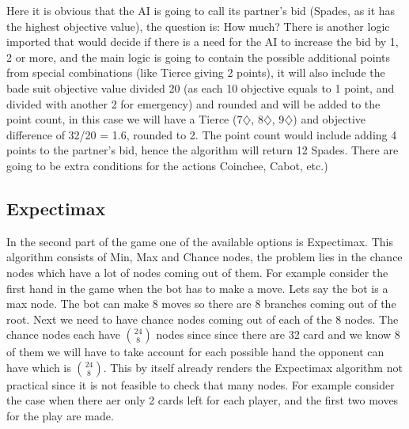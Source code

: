 Here it is obvious that the AI
is going to call its partner's bid (Spades, as it has the highest objective value), the question is: How much? There is another logic
imported that would decide if there is a need for the AI to increase the bid by 1, 2 or
more, and the main logic is going to contain the possible additional points from special
combinations (like Tierce giving 2 points), it will also include the bade suit objective
value divided 20 (as each 10 objective equals to 1 point, and divided with another 2 for emergency)
and rounded and will be added to the point
count, in this case we will have a Tierce (7$\diamondsuit$, 8$\diamondsuit$, 9$\diamondsuit$) and objective difference of 32/20
= 1.6, rounded to 2. The point count would include adding 4 points to the partner's bid,
hence the algorithm will return 12 Spades. There are going to be extra conditions for
the actions Coinchee, Cabot, etc.)


\subsection{Expectimax}
\hspace{\parindent} In the second part of the game one of the available options is Expectimax.
This algorithm consists of Min, Max and Chance nodes, the problem lies in the chance nodes which have a lot of nodes coming out of them.
For example consider the first hand in the game when the bot has to make a move. Lets say the bot is a max node.
The bot can make 8 moves so there are 8 branches coming out of the root. Next we need to have chance nodes coming out of each of the 8 nodes.
The chance nodes each have $\binom{24}{8}$ nodes since since there are 32 card and we know 8 of them we will have to take account for each possible hand the opponent can have which is $\binom{24}{8}$. 
This by itself already renders the  Expectimax algorithm not practical since it is not feasible to check that many nodes.
For example consider the case when there aer only 2 cards left for each player, and the first two moves for the play are made.

